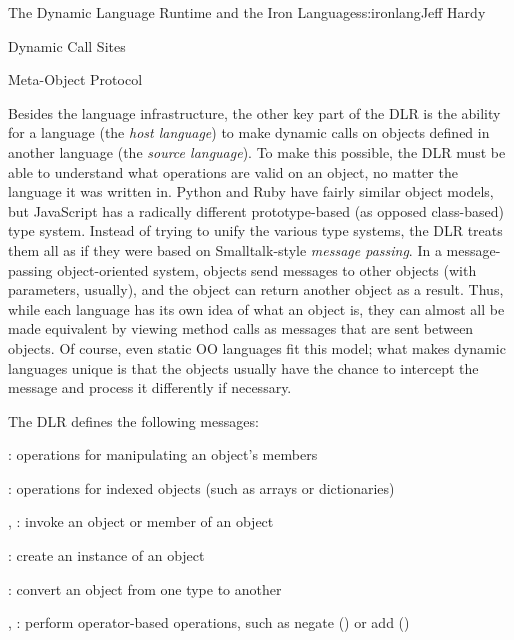 \begin{aosachapter}{The Dynamic Language Runtime and the Iron Languages}{s:ironlang}{Jeff Hardy}
\begin{aosasect1}{Dynamic Call Sites}
\end{aosasect1}

\begin{aosasect1}{Meta-Object Protocol}

Besides the language infrastructure, the other key part of the DLR is
the ability for a language (the \emph{host language}) to make dynamic
calls on objects defined in another language (the \emph{source
  language}). To make this possible, the DLR must be able to
understand what operations are valid on an object, no matter the
language it was written in. Python and Ruby have fairly similar object
models, but JavaScript has a radically different prototype-based (as
opposed class-based) type system. Instead of trying to unify the
various type systems, the DLR treats them all as if they were based on
Smalltalk-style \emph{message passing}. In a message-passing
object-oriented system, objects send messages to other objects (with
parameters, usually), and the object can return another object as a
result. Thus, while each language has its own idea of what an object
is, they can almost all be made equivalent by viewing method calls as
messages that are sent between objects. Of course, even static OO
languages fit this model; what makes dynamic languages unique is that
the objects usually have the chance to intercept the message and
process it differently if necessary.

The DLR defines the following messages:

\begin{aosaitemize}

\item {}: operations for manipulating an
  object's members

\item {}: operations for indexed objects
  (such as arrays or dictionaries)

\item {}, : invoke an object or member
  of an object

\item {}: create an instance of an object

\item {}: convert an object from one type to another

\item {}, : perform
  operator-based operations, such as negate (\code{!}) or add
  (\code{+})


\end{aosaitemize}
\end{aosasect1}
\end{aosachapter}

